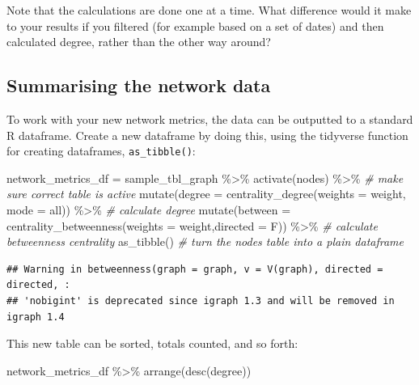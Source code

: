 \documentclass[
]{book}
\newenvironment{Shaded}{\begin{snugshade}}{\end{snugshade}}
\newcommand{\AttributeTok}[1]{\textcolor[rgb]{0.77,0.63,0.00}{#1}}
\newcommand{\CommentTok}[1]{\textcolor[rgb]{0.56,0.35,0.01}{\textit{#1}}}
\newcommand{\FunctionTok}[1]{\textcolor[rgb]{0.00,0.00,0.00}{#1}}
\newcommand{\NormalTok}[1]{#1}
\newcommand{\OtherTok}[1]{\textcolor[rgb]{0.56,0.35,0.01}{#1}}
\newcommand{\SpecialCharTok}[1]{\textcolor[rgb]{0.00,0.00,0.00}{#1}}
\newcommand{\StringTok}[1]{\textcolor[rgb]{0.31,0.60,0.02}{#1}}
\begin{document}
Note that the calculations are done one at a time. What difference would it make to your results if you filtered (for example based on a set of dates) and then calculated degree, rather than the other way around?

\hypertarget{summarising-the-network-data}{%
\subsection{Summarising the network data}\label{summarising-the-network-data}}

To work with your new network metrics, the data can be outputted to a standard R dataframe. Create a new dataframe by doing this, using the tidyverse function for creating dataframes, \texttt{as\_tibble()}:

\begin{Shaded}
\begin{Highlighting}[]
\NormalTok{network\_metrics\_df }\OtherTok{=}\NormalTok{ sample\_tbl\_graph }\SpecialCharTok{\%\textgreater{}\%} 
  \FunctionTok{activate}\NormalTok{(nodes) }\SpecialCharTok{\%\textgreater{}\%} \CommentTok{\# make sure correct table is active}
  \FunctionTok{mutate}\NormalTok{(}\AttributeTok{degree =} \FunctionTok{centrality\_degree}\NormalTok{(}\AttributeTok{weights =}\NormalTok{ weight, }\AttributeTok{mode =} \StringTok{\textquotesingle{}all\textquotesingle{}}\NormalTok{)) }\SpecialCharTok{\%\textgreater{}\%} \CommentTok{\# calculate degree}
  \FunctionTok{mutate}\NormalTok{(}\AttributeTok{between =} \FunctionTok{centrality\_betweenness}\NormalTok{(}\AttributeTok{weights =}\NormalTok{ weight,}\AttributeTok{directed =}\NormalTok{ F)) }\SpecialCharTok{\%\textgreater{}\%}  \CommentTok{\# calculate betweenness centrality}
  \FunctionTok{as\_tibble}\NormalTok{() }\CommentTok{\# turn the nodes table into a plain dataframe}
\end{Highlighting}
\end{Shaded}

\begin{verbatim}
## Warning in betweenness(graph = graph, v = V(graph), directed = directed, :
## 'nobigint' is deprecated since igraph 1.3 and will be removed in igraph 1.4
\end{verbatim}

This new table can be sorted, totals counted, and so forth:

\begin{Shaded}
\begin{Highlighting}[]
\NormalTok{network\_metrics\_df }\SpecialCharTok{\%\textgreater{}\%} \FunctionTok{arrange}\NormalTok{(}\FunctionTok{desc}\NormalTok{(degree))}
\end{Highlighting}
\end{Shaded}
\end{document}
